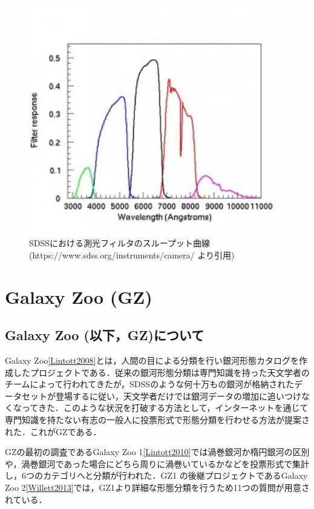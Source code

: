 \documentclass[a4j, 11pt]{jreport}
\begin{document}
\begin{figure}[H]
 \centering
 \includegraphics[width=11cm]{images/camera_filters-300x274.png}
 \caption{SDSSにおける測光フィルタのスループット曲線\\(https://www.sdss.org/instruments/camera/ より引用)}
 \label{fig:filter_responces}
\end{figure}



\section{Galaxy Zoo (GZ)}
\subsection*{Galaxy Zoo (以下，GZ)について}
Galaxy Zoo\ref{Lintott2008}とは，人間の目による分類を行い銀河形態カタログを作成したプロジェクトである．従来の銀河形態分類は専門知識を持った天文学者のチームによって行われてきたが，SDSSのような何十万もの銀河が格納されたデータセットが登場するに従い，天文学者だけでは銀河データの増加に追いつけなくなってきた．このような状況を打破する方法として，インターネットを通じて専門知識を持たない有志の一般人に投票形式で形態分類を行わせる方法が提案された．これがGZである．

GZの最初の調査であるGalaxy Zoo 1\ref{Lintott2010}では渦巻銀河か楕円銀河の区別や，渦巻銀河であった場合にどちら周りに渦巻いているかなどを投票形式で集計し，6つのカテゴリへと分類が行われた．GZ1 の後継プロジェクトであるGalaxy Zoo 2\ref{Willett2013}では，GZ1より詳細な形態分類を行うため11つの質問が用意されている．
\end{document}
